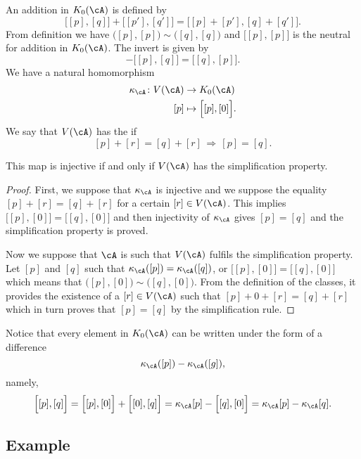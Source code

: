 An addition in $K_0(\cA)$ is defined by 
\[ 
  \Big[ [p],[q] \Big]+\Big[ [p'],[q'] \Big]=\Big[ [p]+[p'],[q]+[q'] \Big].
\]
From definition we have $\Big( [p],[p] \Big)\sim\Big( [q],[q] \Big)$ and $\Big[ [p],[p] \Big]$ is the neutral for addition in $K_0(\cA)$. The invert is given by
\[ 
  -\Big[ [p],[q] \Big]=\Big[ [q],[p] \Big].
\]
We have a natural homomorphism
\begin{equation}
\begin{aligned}
 \kappa_{\cA}\colon V(\cA)&\to K_0(\cA) \\ 
[p]&\mapsto  \Big[ [p],[0] \Big]. 
\end{aligned}
\end{equation}
We say that $V(\cA)$ has the  if 
\[ 
  [p]+[r]=[q]+[r]\,\Rightarrow\,[p]=[q].
\]

\begin{proposition}
This map is injective if and only if $V(\cA)$ has the simplification property.
\end{proposition}

\begin{proof}
First, we suppose that $\kappa_{\cA}$ is injective and we suppose the equality $[p]+[r]=[q]+[r]$ for a certain $[r]\in V(\cA)$. This implies $\Big[ [p],[0] \Big]=\Big[ [q],[0] \Big]$ and then injectivity of $\kappa_{\cA}$ gives $[p]=[q]$ and the simplification property is proved.

Now we suppose that $\cA$ is such that $V(\cA)$ fulfils the simplification property. Let $[p]$ and $[q]$ such that $\kappa_{\cA}([p])=\kappa_{\cA}([q])$, or $\Big[ [p],[0] \Big]=\Big[ [q],[0] \Big]$ which means that $\Big( [p],[0] \Big)\sim\Big( [q],[0] \Big)$. From the definition of the classes, it provides the existence of a $[r]\in V(\cA)$ such that $[p]+0+[r]=[q]+[r]$ which in turn proves that $[p]=[q]$ by the simplification rule.
\end{proof}

Notice that every element in $K_0(\cA)$ can be written under the form of a difference
\[ 
  \kappa_{\cA}([p])-\kappa_{\cA}([g]),
\]
namely,
\[ 
\begin{split}
\Big[ [p],[q] \Big]=\Big[ [p],[0] \Big]+\Big[ [0],[q] \Big]=\kappa_{\cA}[p]-\Big[ [q],[0] \Big]
	=\kappa_{\cA}[p]-\kappa_{\cA}[q].
\end{split}  
\]

\subsection{Example}

